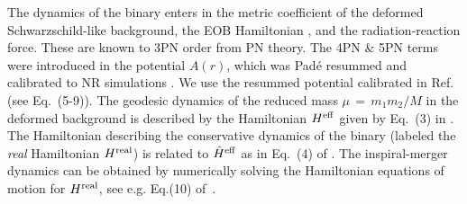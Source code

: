 The dynamics of the binary enters in the metric coefficient of the deformed
Schwarzschild-like background, the EOB Hamiltonian \cite{EOBOriginalBuonannoDamour}, 
and the radiation-reaction force. 
These
are known to 3PN order \cite{EOBOriginalBuonannoDamour,PadeAD} from PN theory.
The 4PN \& 5PN terms were introduced in the potential $A(r)$, which was 
Pad\'{e} resummed and calibrated to NR simulations
\cite{EOBNRdevel01,EOBNRdevel02,EOBNRdevel03,EOBNRdevel04,BuonannoEOBv2Main}.
We use the resummed potential calibrated in Ref.~\cite{BuonannoEOBv2Main} 
(see Eq.~(5-9)). The geodesic dynamics of the reduced mass 
$\mu\,=\,m_1 m_2 / M$ in the deformed background 
is described by
the Hamiltonian $H^{\mathrm{eff}}$ given by Eq.~(3) in \cite{BuonannoEOBv2Main}.
The Hamiltonian describing the conservative dynamics of the binary
(labeled the \textit{real} Hamiltonian $H^{\mathrm{real}}$) is related to 
$\hat{H}^{\mathrm{eff}}$ as in Eq.~(4) of \cite{BuonannoEOBv2Main}.
The inspiral-merger dynamics can be obtained by numerically solving the 
Hamiltonian equations of motion for $H^{\mathrm{real}}$, see e.g. Eq.(10)
of~\cite{BuonannoEOBv2Main}. 

